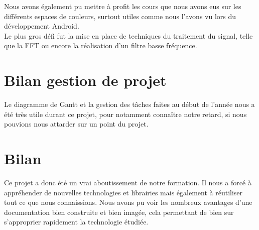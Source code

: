 Nous avons également pu mettre à profit les cours que nous avons eus sur les différents espaces de couleurs, surtout utiles comme nous l'avons vu lors du développement Android.\\
Le plus gros défi fut la mise en place de techniques du traitement du signal, telle que la FFT ou encore la réalisation d'un filtre basse fréquence.
\section{Bilan gestion de projet}
	Le diagramme de Gantt et la gestion des tâches faites au début de l'année nous a été très utile durant ce projet, pour notamment connaître notre retard, si nous pouvions nous attarder sur un point du projet. 

\section{Bilan}

Ce projet a donc été un vrai aboutissement de notre formation. Il nous a forcé à appréhender de nouvelles technologies et librairies mais également à réutiliser tout ce que nous
 connaissions. Nous avons pu voir les nombreux avantages d'une documentation bien construite et bien imagée, cela permettant de bien sur s'approprier rapidement la technologie étudiée.
